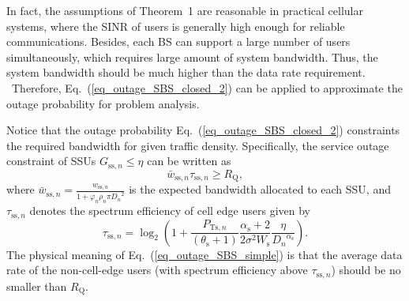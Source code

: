 \documentclass[12pt, draftclsnofoot,onecolumn]{IEEEtran}
\begin{document}
In fact, the assumptions of Theorem~1 are reasonable in practical cellular systems, where the SINR of users is generally high enough for reliable communications.
Besides, each BS can support a large number of users simultaneously, which requires large amount of system bandwidth.
Thus, the system bandwidth should be much higher than the data rate requirement. \
Therefore, Eq.~(\ref{eq_outage_SBS_closed_2}) can be applied to approximate the outage probability for problem analysis.

Notice that the outage probability Eq.~(\ref{eq_outage_SBS_closed_2}) constraints the required bandwidth for given traffic density. 
Specifically, the service outage constraint of SSUs $G_{\mathrm{ss},n} \leq \eta$ can be written as
        \begin{equation}\label{eq_outage_SBS_simple}
            \bar{w}_{\mathrm{ss},n} \tau_{\mathrm{ss},n} \geq R_\mathrm{Q},
        \end{equation}
where $\bar{w}_{\mathrm{ss},n}=\frac{w_{\mathrm{ss},n}}{1+ \varphi_n \rho_{n} \pi {D_{n}}^2}$ is the expected bandwidth allocated to each SSU, and $\tau_{\mathrm{ss},n}$ denotes the spectrum efficiency of cell edge users given by
        \begin{equation}\label{eq_tau_SBS}
            \tau_{\mathrm{ss},n} = \log_2 \left( 1+ \frac{P_{\mathrm{Ts},n}}{(\theta_\mathrm{s}+1)} \frac{\alpha_\mathrm{s}+2}{2 \sigma^2 W_\mathrm{s}} \frac{\eta}{{D_{n}}^{\alpha_\mathrm{s}}} \right).
        \end{equation}
The physical meaning of Eq.~(\ref{eq_outage_SBS_simple}) is that the average data rate of the non-cell-edge users (with spectrum efficiency above $\tau_{\mathrm{ss},n}$) should be no smaller than $R_\mathrm{Q}$.
\end{document}
